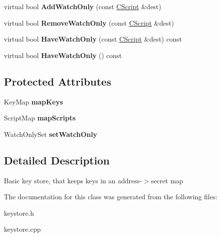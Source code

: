 \begin{DoxyCompactItemize}
virtual bool {\bfseries Add\+Watch\+Only} (const \mbox{\hyperlink{class_c_script}{C\+Script}} \&dest)
\item 
\mbox{\label{class_c_basic_key_store_a20c0eccf943d6d16e24c6e2fb63fb527}} 
virtual bool {\bfseries Remove\+Watch\+Only} (const \mbox{\hyperlink{class_c_script}{C\+Script}} \&dest)
\item 
\mbox{\label{class_c_basic_key_store_a3ce143be2a1d3e752972614cf7fb7efb}} 
virtual bool {\bfseries Have\+Watch\+Only} (const \mbox{\hyperlink{class_c_script}{C\+Script}} \&dest) const
\item 
\mbox{\label{class_c_basic_key_store_aa6686d4477a180096436e7d491142f10}} 
virtual bool {\bfseries Have\+Watch\+Only} () const
\end{DoxyCompactItemize}
\subsection*{Protected Attributes}
\begin{DoxyCompactItemize}
\item 
\mbox{\label{class_c_basic_key_store_ac520003e5c3d863bf71fde247c6e0672}} 
Key\+Map {\bfseries map\+Keys}
\item 
\mbox{\label{class_c_basic_key_store_a8e9fa81382129c1535a0ee7b0d9c8f3b}} 
Script\+Map {\bfseries map\+Scripts}
\item 
\mbox{\label{class_c_basic_key_store_ac3391cb491e315403ad9af6afd1313da}} 
Watch\+Only\+Set {\bfseries set\+Watch\+Only}
\end{DoxyCompactItemize}


\subsection{Detailed Description}
Basic key store, that keeps keys in an address-\/$>$secret map 

The documentation for this class was generated from the following files\+:\begin{DoxyCompactItemize}
\item 
keystore.\+h\item 
keystore.\+cpp\end{DoxyCompactItemize}
